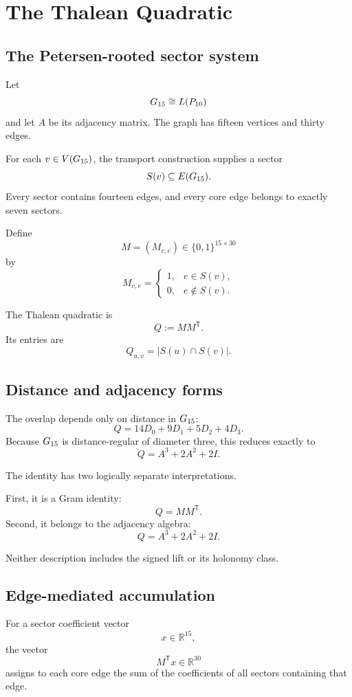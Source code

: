 \section{The Thalean Quadratic}

\subsection{The Petersen-rooted sector system}

Let
\[
G_{15}\cong L(P_{10})
\]
and let \(A\) be its adjacency matrix.  The graph has fifteen
vertices and thirty edges.

For each \(v\in V(G_{15})\), the transport construction supplies a
sector
\[
S(v)\subseteq E(G_{15}).
\]
Every sector contains fourteen edges, and every core edge belongs to
exactly seven sectors.

Define
\[
M=(M_{v,e})\in\{0,1\}^{15\times30}
\]
by
\[
M_{v,e}
=
\begin{cases}
1,&e\in S(v),\\
0,&e\notin S(v).
\end{cases}
\]

The Thalean quadratic is
\[
Q:=MM^{\mathsf T}.
\]
Its entries are
\[
Q_{u,v}
=
|S(u)\cap S(v)|.
\]

\subsection{Distance and adjacency forms}

The overlap depends only on distance in \(G_{15}\):
\[
Q
=
14D_0+9D_1+5D_2+4D_3.
\]
Because \(G_{15}\) is distance-regular of diameter three, this
reduces exactly to
\[
Q=A^3+2A^2+2I.
\]

The identity has two logically separate interpretations.

First, it is a Gram identity:
\[
Q=MM^{\mathsf T}.
\]
Second, it belongs to the adjacency algebra:
\[
Q=A^3+2A^2+2I.
\]

Neither description includes the signed lift or its holonomy class.

\subsection{Edge-mediated accumulation}

For a sector coefficient vector
\[
x\in\mathbb R^{15},
\]
the vector
\[
M^{\mathsf T}x\in\mathbb R^{30}
\]
assigns to each core edge the sum of the coefficients of all sectors
containing that edge.


